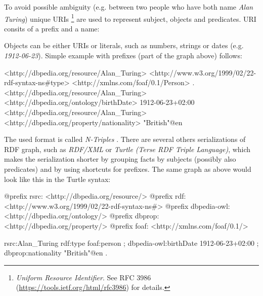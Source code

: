 \documentclass[12pt, twoside]{fithesis2}		%
\renewcommand{\_}{\leavevmode \kern0.07em\vbox{\hrule width0.4em}}
\begin{document}
To avoid possible ambiguity (e.g. between two people who have both name \textit{Alan Turing})
unique URIs%
\footnote{\emph{Uniform Resource Identifier}. See RFC 3986 (\url{https://tools.ietf.org/html/rfc3986}) for details.}
are used to represent subject, objects and predicates.
URI consits of a prefix and a name:
\begin{center}
\end{center}
\noindent
Objects can be either URIs or literals, such as numbers, strings or dates (e.g. \emph{1912-06-23}).
Simple example with prefixes (part of the graph above) follows:
\begin{code}
<http://dbpedia.org/resource/Alan_Turing>
    <http://www.w3.org/1999/02/22-rdf-syntax-ns#type>
    <http://xmlns.com/foaf/0.1/Person> .
<http://dbpedia.org/resource/Alan_Turing>
    <http://dbpedia.org/ontology/birthDate>
    1912-06-23+02:00
<http://dbpedia.org/resource/Alan_Turing>
   <http://dbpedia.org/property/nationality>
   "British"@en
\end{code}

The used format is called \textit{N-Triples} \cite[][68]{semantic-web}.
There are several others serializations of RDF graph, such as \textit{RDF/XML}
\cite[][73]{semantic-web}
or \emph{Turtle (Terse RDF Triple Language)},
which makes the serialization shorter by grouping facts by subjects (possibly also predicates) and by using shortcuts for prefixes. The same graph as above would look like this in the Turtle syntax:

\begin{code}
@prefix rsrc: <http://dbpedia.org/resource/>
@prefix rdf: <http://www.w3.org/1999/02/22-rdf-syntax-ns#>
@prefix dbpedia-owl: <http://dbpedia.org/ontology/>
@prefix dbprop: <http://dbpedia.org/property/>
@prefix foaf: <http://xmlns.com/foaf/0.1/>

rsrc:Alan_Turing
  rdf:type foaf:person ;
  dbpedia-owl:birthDate 1912-06-23+02:00 ;
  dbprop:nationality "British"@en .
\end{code}
\end{document}
